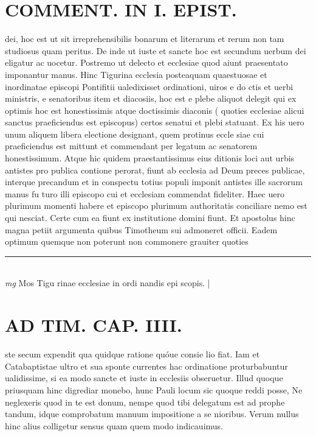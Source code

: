 \documentclass{article}
\begin{document}
\begin{pages}
\section*{COMMENT. IN I. EPIST. }\pstart dei, hoc est ut sit irreprehensibilis bonarum et literarum et rerum non tam studiosus quam peritus. De inde ut iuste et sancte hoc est secundum uerbum dei eligatur ac uocetur. Postremo ut delecto et ecclesiae quod aiunt praesentato imponantur manus. Hinc Tigurina ecclesia posteaquam quaestuosae et inordinatae episcopi Pontifitii ualedixisset ordinationi, uiros e do ctis et uerbi ministris, e senatoribus item et diacosiis, hoc est e plebe aliquot delegit qui ex optimis hoc est honestissimis atque doctissimis diaconis ( quoties ecclesiae alicui sanctus praeficiendus est episcopus) certos senatui et plebi statuant. Ex his uero unum aliquem libera electione designant, quem protinus eccle siae cui praeficiendus est mittunt et commendant per legatum ac senatorem honestissimum. Atque hic quidem praestantissimus eius ditionis loci aut urbis antistes pro publica contione perorat, fiunt ab ecclesia ad Deum preces publicae, interque precandum et in conspectu totius populi imponit antistes ille sacrorum manus fu turo illi episcopo cui et ecclesiam commendat fideliter. Haec uero plurimum momenti habere et episcopo plurimum authoritatis conciliare nemo est qui nesciat. Certe cum ea fiunt ex institutione domini fiunt. Et apostolus hinc magna petiit argumenta quibus Timotheum sui admoneret officii. Eadem optimum quemque non poterunt non commonere grauiter quoties  \pend
\vspace{0.5cm}\noindent
\vspace{0.2cm}\rule{1cm}{0.2pt}\\ 
\hspace{0.2cm}\textit{mg}
\footnotesize Mos Tigu rinae ecclesiae in ordi nandis epi scopis. 
\normalsize| 
\section*{AD TIM. CAP. IIII. }
\marginpar{[ p.147 ]}\pstart ste secum expendit qua quidque ratione quóue consie lio fiat. Iam et Catabaptistae ultro et sua sponte currentes hac ordinatione proturbabuntur ualidissime, si ea modo sancte et iuste in ecclesiis obseruetur. Illud quoque priusquam hinc digrediar monebo, hunc Pauli locum sic quoque reddi posse, Ne neglexeris quod in te est donum, nempe quod tibi delegatum est ad prophe tandum, idque comprobatum manuum impositione a se nioribus. Verum nullus hinc alius colligetur sensus quam quem modo indicauimus.  \pend
{}
{}

\end{pages}
\end{document}
